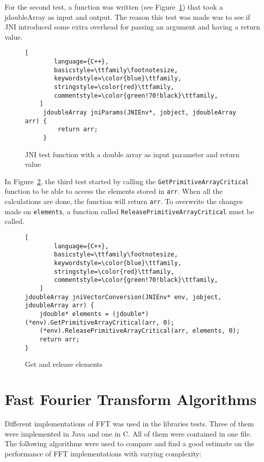 For the second test, a function was written (see Figure~\ref{fig:jni:params}) that took a jdoubleArray as input and output. The reason this test was made was to see if JNI introduced some extra overhead for passing an argument and having a return value.

\begin{figure}[H]
\begin{lstlisting}[
        language={C++},
        basicstyle=\ttfamily\footnotesize,
        keywordstyle=\color{blue}\ttfamily,
        stringstyle=\color{red}\ttfamily,
        commentstyle=\color{green!70!black}\ttfamily,
    ]
     jdoubleArray jniParams(JNIEnv*, jobject, jdoubleArray arr) {
         return arr;
     }
\end{lstlisting}
\caption{JNI test function with a double array as input parameter and return value}
\label{fig:jni:params}
\end{figure}

In Figure~\ref{fig:jni:conversion}, the third test started by calling the \texttt{GetPrimitiveArrayCritical} function to be able to access the elements stored in \texttt{arr}. When all the calculations are done, the function will return \texttt{arr}. To overwrite the changes made on \texttt{elements}, a function called \texttt{ReleasePrimitiveArrayCritical} must be called.

\begin{figure}
\begin{lstlisting}[
        language={C++},
        basicstyle=\ttfamily\footnotesize,
        keywordstyle=\color{blue}\ttfamily,
        stringstyle=\color{red}\ttfamily,
        commentstyle=\color{green!70!black}\ttfamily,
    ]
jdoubleArray jniVectorConversion(JNIEnv* env, jobject, jdoubleArray arr) {
    jdouble* elements = (jdouble*)(*env).GetPrimitiveArrayCritical(arr, 0);
    (*env).ReleasePrimitiveArrayCritical(arr, elements, 0);
    return arr;
}
\end{lstlisting}
\caption{Get and release elements}
\label{fig:jni:conversion}
\end{figure}

\section{Fast Fourier Transform Algorithms}

Different implementations of FFT was used in the libraries tests. Three of them were implemented in Java and one in C. All of them were contained in one file. The following algorithms were used to compare and find a good estimate on the performance of FFT implementations with varying complexity:

